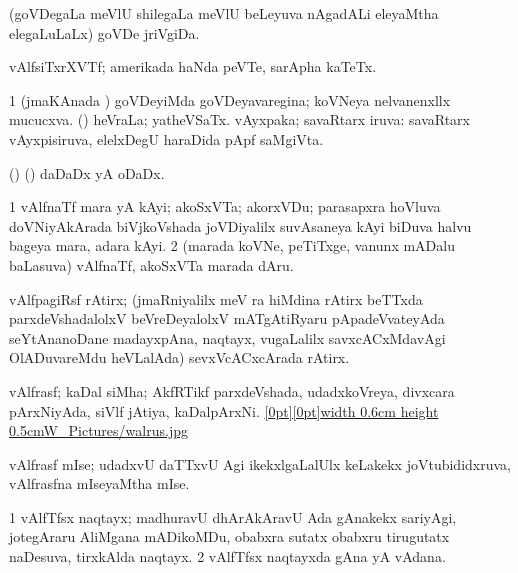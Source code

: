 {\bentry
{} 
\gl{\nA}
\expl{}
\bmng
(goVDegaLa meVlU shilegaLa meVlU beLeyuva nAgadALi eleyaMtha elegaLuLaLx) goVDe jriVgiDa. 
\emng
\eentry

\bentry
{} 
\gl{\nA}
\expl{}
\bmng
vAlfsiTxrXVTf; amerikada haNda peVTe, sarApha kaTeTx. 
\emng
\eentry

\bentry 
{} 
\gl{\gu}
\expl{}
\bmng
\bnum
\num{1} (jmaKAnada \vi) goVDeyiMda goVDeyavaregina; koVNeya nelvanenxllx mucucxva. 
 (\AmA) 
\banum
{} heVraLa; yatheVSaTx. 
 vAyxpaka; savaRtarx iruva:  savaRtarx vAyxpisiruva, elelxDegU haraDida pApf saMgiVta. 
\eanum
\numie
\enum
\emng
\eentry

\bentry
{} 
\gl{\nA}
\bmng
(\birx) (\ashi) daDaDx yA oDaDx. 
\emng
\eentry

\bentry
{} 
\gl{\nA}
\bmng
\bnum
\num{1} vAlfnaTf mara yA kAyi; akoSxVTa; akorxVDu; parasapxra hoVluva doVNiyAkArada biVjkoVshada joVDiyalilx suvAsaneya kAyi biDuva halvu bageya mara, adara kAyi. 
\num{2} (marada koVNe, peTiTxge, \mo vanunx mADalu baLasuva) vAlfnaTf, akoSxVTa marada dAru. 
\enum
\emng
\eentry

\bentry
{} 
\gl{\nA}
\expl{}
\bmng
vAlfpagiRsf rAtirx; (jmaRniyalilx meV ra hiMdina rAtirx beTTxda parxdeVshadalolxV beVreDeyalolxV mATgAtiRyaru pApadeVvateyAda seYtAnanoDane madayxpAna, naqtayx, \mo vugaLalilx savxcACxMdavAgi OlADuvareMdu heVLalAda) sevxVcACxcArada rAtirx. 
\emng
\eentry

\bentry
{} 
\gl{\nA}
\bmng
vAlfrasf; kaDal siMha; AkfRTikf parxdeVshada, udadxkoVreya, divxcara pArxNiyAda, siVlf jAtiya, kaDalpArxNi. \quad \hyperlink{walrusfigure}{\raisebox{-0.20cm}[0pt][0pt]{\pdfimage width 0.6cm height 0.5cm{W_Pictures/walrus.jpg}}} 
\emng
\eentry

\bentry
{} 
\gl{\nA}
\expl{}
\bmng
vAlfrasf mIse; udadxvU daTTxvU Agi ikekxlgaLalUlx keLakekx joVtubididxruva, vAlfrasfna mIseyaMtha mIse. 
\emng
\eentry

\bentry
{} 
\gl{\nA}
\expl{}
\bmng
\bnum
\num{1} vAlfTfsx naqtayx; madhuravU dhArAkAravU Ada gAnakekx sariyAgi, jotegAraru AliMgana mADikoMDu, obabxra sutatx obabxru tirugutatx naDesuva, tirxkAlda naqtayx. 
\num{2} vAlfTfsx naqtayxda gAna yA vAdana. 
\enum
\emng
\eentry

}
